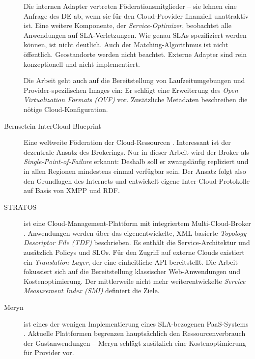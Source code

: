 \begin{description}
	Die internen Adapter vertreten Föderationsmitglieder -- sie lehnen eine Anfrage des DE ab, wenn sie für den Cloud-Provider finanziell unattraktiv ist. Eine weitere Komponente, der \emph{Service-Optimizer}, beobachtet alle Anwendungen auf SLA-Verletzungen. Wie genau SLAs spezifiziert werden können, ist nicht deutlich. Auch der Matching-Algorithmus ist nicht öffentlich. Geostandorte werden nicht beachtet. Externe Adapter sind rein konzeptionell und nicht implementiert.
	
	Die Arbeit geht auch auf die Bereitstellung von Laufzeitumgebungen und Provider-spezifischen Images ein: Er schlägt eine Erweiterung des \emph{Open Virtualization Formats (OVF)} vor. Zusätzliche Metadaten beschreiben die nötige Cloud-Konfiguration.
	
	
	\item[Bernsetein InterCloud Blueprint] Eine weltweite Föderation der Cloud-Ressourcen \cite{bernstein:2011:intercloud}. Interessant ist der dezentrale Ansatz des Brokerings. Nur in dieser Arbeit wird der Broker als \emph{Single-Point-of-Failure} erkannt: Deshalb soll er zwangsläufig repliziert und in allen Regionen mindestens einmal verfügbar sein. Der Ansatz folgt also den Grundlagen des Internets und entwickelt eigene Inter-Cloud-Protokolle auf Basis von XMPP und RDF.
	
	
	\item[STRATOS] ist eine Cloud-Management-Plattform mit integriertem Multi-Cloud-Broker \cite{pawluk:2012:stratos}. Anwendungen werden über das eigenentwickelte, XML-basierte \emph{Topology Descriptor File (TDF)} beschrieben. Es enthält die Service-Architektur und zusätzlich Policys und SLOs. Für den Zugriff auf externe Clouds existiert ein \emph{Translation-Layer}, der eine einheitliche API bereitstellt. Die Arbeit fokussiert sich auf die Bereitstellung klassischer Web-Anwendungen und Kostenoptimierung. Der mittlerweile nicht mehr weiterentwickelte \emph{Service Measurement Index (SMI)} definiert die Ziele.
	
	\item[Meryn] ist eines der wenigen Implementierung eines SLA-bezogenen PaaS-Systems \cite{dib:2013:meryn}. Aktuelle Plattformen begrenzen hauptsächlich den Ressourcenverbrauch der Gastanwendungen -- Meryn schlägt zusätzlich eine Kostenoptimierung für Provider vor.
	

\end{description}
